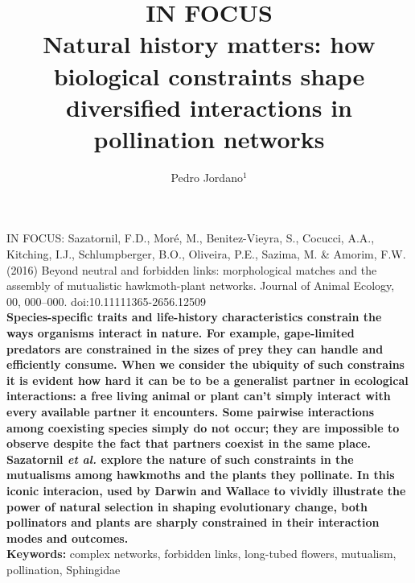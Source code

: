 \documentclass[a4paper,12pt]{article}
\title{IN FOCUS \\ Natural history matters: how biological constraints shape diversified interactions in pollination networks}
\author{Pedro Jordano$^{1}$}
\begin{document}
\maketitle

  \noindent 
  IN FOCUS: Sazatornil, F.D., Moré, M., Benitez-Vieyra, S., Cocucci, A.A., Kitching, I.J., Schlumpberger, B.O., Oliveira, P.E., Sazima, M. \& Amorim, F.W. (2016) Beyond neutral and forbidden links: morphological matches and the assembly of mutualistic hawkmoth-plant networks. Journal of Animal Ecology, 00, 000–000. doi:10.1111\/1365-2656.12509 \\
  
  \textbf{Species-specific traits and life-history characteristics constrain the ways organisms interact in nature. For example, gape-limited predators are constrained in the sizes of prey they can handle and efficiently consume. When we consider the ubiquity of such constrains it is evident how hard it can be to be a generalist partner in ecological interactions: a free living animal or plant can't simply interact with every available partner it encounters. Some pairwise interactions among coexisting species simply do not occur; they are impossible to observe despite the fact that partners coexist in the same place. Sazatornil \textit{et al.} \citep{Sazatornil:2016} explore the nature of such constraints in the mutualisms among hawkmoths and the plants they pollinate. In this iconic interacion, used by Darwin and Wallace to vividly illustrate the power of natural selection in shaping evolutionary change, both pollinators and plants are sharply constrained in their interaction modes and outcomes. } \\

\noindent \textbf{Keywords:} complex networks, forbidden links, long-tubed flowers, mutualism, pollination, Sphingidae

\newpage
\end{document}
